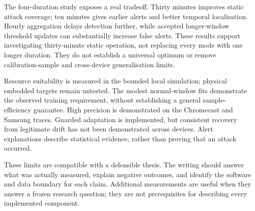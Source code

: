 The four-duration study exposes a real tradeoff. Thirty minutes improves
static attack coverage; ten minutes gives earlier alerts and better temporal
localisation. Hourly aggregation delays detection further, while accepted
longer-window threshold updates can substantially increase false alerts.
These results support investigating thirty-minute static operation, not
replacing every mode with one longer duration. They do not establish a universal
optimum or remove calibration-sample and cross-device generalisation limits.

Resource suitability is measured in the bounded local simulation; physical
embedded targets remain untested. The modest normal-window fits demonstrate
the observed training requirement, without establishing a general
sample-efficiency guarantee. High precision is demonstrated on the
Chromecast and Samsung traces. Guarded adaptation is implemented, but consistent
recovery from legitimate drift has not been demonstrated across devices. Alert explanations
describe statistical evidence, rather than proving that an attack occurred.

These limits are compatible with a defensible thesis. The writing should
answer what was actually measured, explain negative outcomes, and identify the
software and data boundary for each claim. Additional measurements are useful
when they answer a frozen research question; they are not prerequisites for
describing every implemented component.

